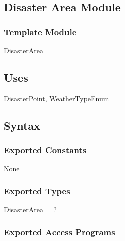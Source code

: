 \documentclass[12pt]{article}
\begin{document}
                \subsection* {Disaster Area Module}
                
                \subsubsection*{Template Module}
                
                DisasterArea
                
                \subsection* {Uses}
                
                DisasterPoint, WeatherTypeEnum
                
                \subsection* {Syntax}
                
                \subsubsection * {Exported Constants}
                
                None
                
                \subsubsection* {Exported Types}
                
                DisasterArea = ?
                
                \subsubsection* {Exported Access Programs}
                
\end{document}
